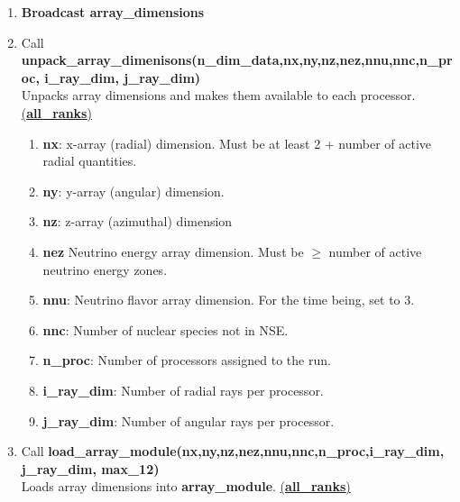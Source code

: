 \documentclass[11pt,doublespace]{article}
\begin{document}
\begin{itemize}
\begin{enumerate}
\begin{enumerate}
\begin{enumerate}
  {\bf jmin}: (output) inner y-array index.\\
  {\bf jmax}: (output) inner x-array index.\\
  {\bf kmin}: (output) inner z-array index.\\
  {\bf kmax}: (output) outer z-array index.
  \item Close file {\bf restart.d}
\end{enumerate}
  \item END IF
  \item Check array dimensions and processor number for compatibility.
  \item Compute {\bf i\_ray\_dim} and {\bf j\_ray\_dim}.
  \item Pack array dimensions in integer array {\bf n\_dim\_data}
\end{enumerate}
  \item {\bf Broadcast array\_dimensions}
  \item Call {\bf unpack\_array\_dimenisons(n\_dim\_data,nx,ny,nz,nez,nnu,nnc,n\_proc, i\_ray\_dim, j\_ray\_dim)}\\
  Unpacks array dimensions and makes them available to each processor. \underline{({\bf all\_ranks})}
\begin{enumerate}
  \item {\bf nx}: x-array (radial) dimension. Must be at least 2 + number of active radial quantities.
  \item {\bf ny}: y-array (angular) dimension.
  \item {\bf nz}: z-array (azimuthal) dimension
  \item  {\bf nez} Neutrino energy array dimension. Must be $\ge$ number of active neutrino energy zones.
  \item  {\bf nnu}: Neutrino flavor array dimension. For the time being, set to 3.
  \item  {\bf nnc}: Number of nuclear species not in NSE.
  \item  {\bf n\_proc}: Number of processors assigned to the run.
  \item  {\bf i\_ray\_dim}: Number of radial rays per processor.
  \item  {\bf j\_ray\_dim}: Number of angular rays per processor.
\end{enumerate}
  \item Call {\bf load\_array\_module(nx,ny,nz,nez,nnu,nnc,n\_proc,i\_ray\_dim, j\_ray\_dim, max\_12)}\\
  Loads array dimensions into {\bf array\_module}.  \underline{({\bf all\_ranks})}

\end{enumerate}
\end{itemize}
\end{document}

